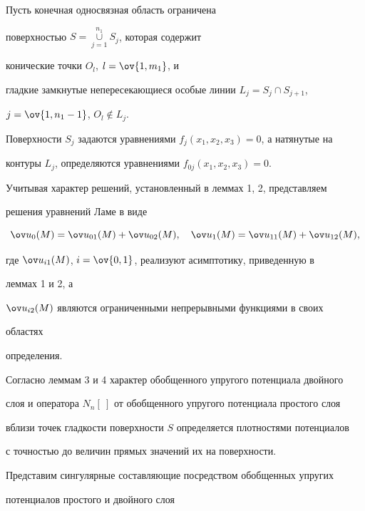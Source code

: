 \begin{pf} 


Пусть конечная односвязная область ограничена  


поверхностью $S=\mathop{\cup}\limits^{n_1}_{j=1}S_j$, которая содержит 


конические точки $O_l$, $l=\ov{1,m_1}$, и  


гладкие замкнутые непересекающиеся особые линии $L_j=S_j\cap S_{j+1}$, 


$j=\ov{1,n_1-1}$, $O_l\notin L_j$.  


Поверхности $S_j$ задаются уравнениями $f_j(x_1,x_2,x_3)=0$, а натянутые на  


контуры $L_j$, определяются уравнениями $f_{0j}(x_1,x_2,x_3)=0$. 


 


Учитывая характер решений, установленный в леммах 1, 2, представляем  


решения уравнений Ламе в виде 


\begin{equation} 


\ov u_0(M)=\ov u_{01}(M)+\ov u_{02}(M),\quad 


\ov u_1(M)=\ov u_{11}(M)+\ov u_{12}(M), 


\end{equation} 


где $\ov u_{i1}(M)$, $i=\ov{0,1}$, реализуют асимптотику, приведенную в 


леммах 1 и 2, а  


$\ov u_{i2}(M)$ являются ограниченными непрерывными функциями в своих 


областях  


определения. 


 


Согласно леммам 3 и 4 характер обобщенного упругого потенциала двойного  


слоя и оператора $N_n[\ ]$ от обобщенного упругого потенциала простого слоя  


вблизи точек гладкости поверхности $S$ определяется плотностями потенциалов  


с точностью до величин прямых значений их на поверхности. 


 


Представим сингулярные составляющие посредством обобщенных упругих  


потенциалов простого и двойного слоя 



\end{pf}
